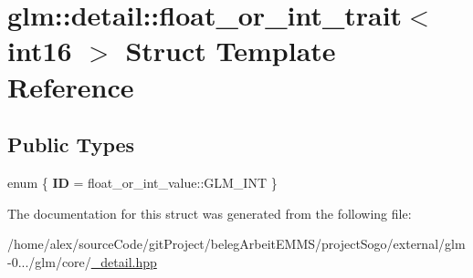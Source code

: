 \hypertarget{structglm_1_1detail_1_1float__or__int__trait_3_01int16_01_4}{\section{glm\-:\-:detail\-:\-:float\-\_\-or\-\_\-int\-\_\-trait$<$ int16 $>$ Struct Template Reference}
\label{structglm_1_1detail_1_1float__or__int__trait_3_01int16_01_4}
}
\subsection*{Public Types}
\begin{DoxyCompactItemize}
\item 
enum \{ {\bfseries I\-D} = float\-\_\-or\-\_\-int\-\_\-value\-:\-:G\-L\-M\-\_\-\-I\-N\-T
 \}
\end{DoxyCompactItemize}


The documentation for this struct was generated from the following file\-:\begin{DoxyCompactItemize}
\item 
/home/alex/source\-Code/git\-Project/beleg\-Arbeit\-E\-M\-M\-S/project\-Sogo/external/glm-\/0.../glm/core/\hyperlink{__detail_8hpp}{\-\_\-detail.\-hpp}\end{DoxyCompactItemize}
